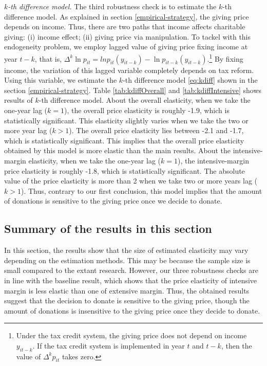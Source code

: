 \documentclass[
  11pt,
  a4paper,
]{article}
\begin{document}
\emph{\(k\)-th difference model.}
The third robustness check is to estimate the \(k\)-th difference model.
As explained in section \ref{empirical-strategy}, the giving price depends on income.
Thus, there are two paths that income affects charitable giving: (i) income effect; (ii) giving price via manipulation.
To tackel with this endogeneity problem, we employ lagged value of giving price fixing income at year \(t-k\),
that is, \(\Delta^k \ln p_{it} = ln p_{it}(y_{it-k}) - \ln p_{it-k}(y_{it-k})\).\footnote{Under the tax credit system, the giving price does not depend on income \(y_{it-k}\). If the tax credit system is implemented in year \(t\) and \(t-k\), then the value of \(\Delta^k p_{it}\) takes zero.}
By fixing income, the variation of this lagged variable completely depends on tax reform.
Using this variable,
we estimate the \(k\)-th difference model \eqref{eq:kdiff} shown in the section \ref{empirical-strategy}.
Table \ref{tab:kdiffOverall} and \ref{tab:kdiffIntensive} shows results of \(k\)-th difference model.
About the overall elasticity,
when we take the one-year lag (\(k = 1\)), the overall price elasticity is roughly -1.9,
which is statistically significant.
This elasticity slightly varies when we take the two or more year lag (\(k > 1\)).
The overall price elasticity lies between -2.1 and -1.7, which is statistically significant.
This implies that the overall price elasticity obtained by this model is more elastic than the main results.
About the intensive-margin elasticity,
when we take the one-year lag (\(k = 1\)), the intensive-margin price elasticity is roughly -1.8,
which is statistically significant.
The absolute value of the price elasticity is more than 2
when we take two or more years lag (\(k > 1\)).
Thus, contrary to our first conclusion,
this model implies that the amount of donations is sensitive to the giving price once we decide to donate.

\hypertarget{summary-of-the-results-in-this-section}{%
\subsection{Summary of the results in this section}\label{summary-of-the-results-in-this-section}}

In this section,
the results show that the size of estimated elasticity may vary depending on the estimation methods.
This may be because the sample size is small compared to the extant research.
However, our three robustness checks are in line with the baseline result,
which shows that the price elasticity of intensive margin is less elastic than one of extensive margin.
Thus, the obtained results suggest that the decision to donate is sensitive to the giving price,
though the amount of donations is insensitive to the giving price once they decide to donate.
\end{document}
